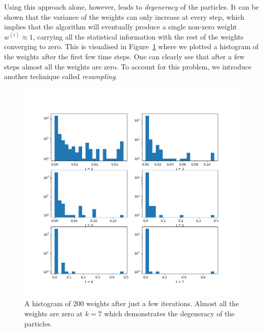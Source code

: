 Using this approach alone, however, leads to \emph{degeneracy} of the
particles. It can be shown that the variance of the weights can only
increase at every step, which implies that the algorithm will
eventually produce a single non-zero weight $w^{(i)} \approx 1$,
carrying all the statistical information with the rest of the weights
converging to zero. This is visualised in Figure~\ref{fig:weights}
where we plotted a histogram of the weights after the first few time
steps. One can clearly see that after a few steps almost all the
weights are zero. To account for this problem, we introduce another
technique called \emph{resampling}.
\begin{figure}
  \centering
  \includegraphics[width=\textwidth]{figures/Figure_weights.png}
  \caption{A histogram of 200 weights after just a few
    iterations. Almost all the weights are zero at $k = 7$ which
    demonstrates the degeneracy of the particles.}%
  \label{fig:weights}
\end{figure}

